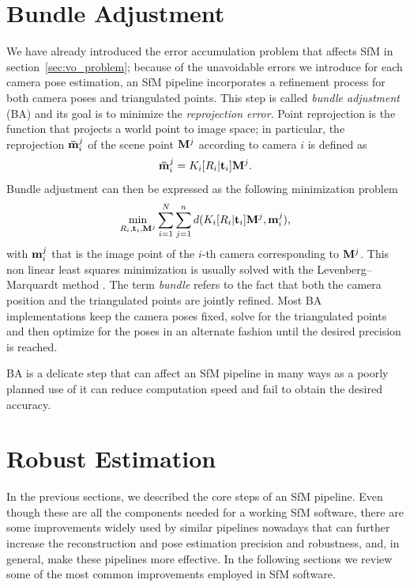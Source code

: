 \section{Bundle Adjustment}
We have already introduced the error accumulation problem that affects SfM in 
section~\ref{sec:vo_problem}; because of the unavoidable errors we introduce 
for each camera pose estimation, an SfM pipeline incorporates a 
refinement process for both camera poses and triangulated points.
This step is called \textit{bundle adjustment} (BA) and its goal is to 
minimize the \textit{reprojection error}.
Point reprojection is the function that projects a world point to image space; 
in particular, the reprojection ${\mathbf{\bar{m}}_i}^j$ of the scene point 
$\mathbf{M}^j$ according to camera $i$ is defined as
\begin{equation*}
	{\mathbf{\bar{m}}_i}^j = K_i[R_i | \mathbf{t}_i]\mathbf{M}^j	\text{.}
\end{equation*}
\noindent Bundle adjustment can then be expressed as the following minimization 
problem
\begin{equation*}
	\label{eq:bundle_adj}
	\min_{R_i, \mathbf{t}_i, \mathbf{M}^j} 
	\sum_{i = 1}^N\sum_{j = 1}^n 
	d(K_i[R_i | \mathbf{t}_i]\mathbf{M}^j, \mathbf{m}_i^j) \text{,}
\end{equation*}
\noindent with $\mathbf{m}_i^j$ that is the image point of the $i$-th camera
corresponding to $\mathbf{M}^j$.
This non linear least squares minimization is usually solved with the 
Levenberg–Marquardt method 
\cite{triggs1999bundle,Hartley2004,levenberg1944method}.
The term \textit{bundle} refers to the fact that both the camera position and
the triangulated points are jointly refined. Most BA implementations keep the 
camera poses fixed, solve for the triangulated points and then optimize for the
poses in an alternate fashion until the desired precision is reached.

BA is a delicate step that can affect an SfM pipeline in many ways
\cite{lourakis2009sba,triggs1999bundle,Hartley2004} as a poorly planned use of 
it can reduce computation speed and fail to obtain the desired accuracy.

\section{Robust Estimation}
In the previous sections, we described the core steps of an SfM pipeline.
Even though these are all the components needed for a working SfM software, 
there are some improvements widely used by similar pipelines nowadays
that can further increase the reconstruction and pose estimation 
precision and robustness, and, in general, make these pipelines more effective.
In the following sections we review some of the most common improvements 
employed in SfM software.

